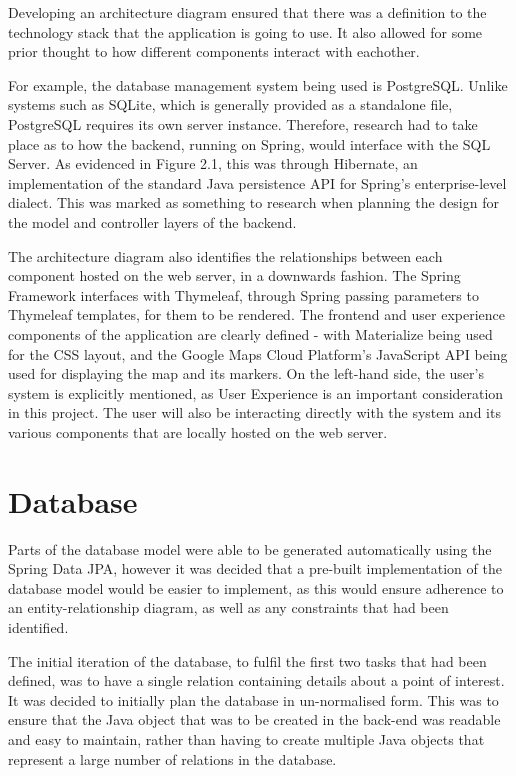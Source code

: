 Developing an architecture diagram ensured that there was a definition to the technology stack that the application is going to use. It also allowed for some prior thought to how different components interact with eachother.

For example, the database management system being used is PostgreSQL. Unlike systems such as SQLite, which is generally provided as a standalone file, PostgreSQL requires its own server instance. Therefore, research had to take place as to how the backend, running on Spring, would interface with the SQL Server. As evidenced in Figure 2.1, this was through Hibernate, an implementation of the standard Java persistence API for Spring's enterprise-level dialect. This was marked as something to research when planning the design for the model and controller layers of the backend.

The architecture diagram also identifies the relationships between each component hosted on the web server, in a downwards fashion. The Spring Framework interfaces with Thymeleaf, through Spring passing parameters to Thymeleaf templates, for them to be rendered. The frontend and user experience components of the application are clearly defined - with Materialize being used for the CSS layout, and the Google Maps Cloud Platform's JavaScript API being used for displaying the map and its markers. On the left-hand side, the user's system is explicitly mentioned, as User Experience is an important consideration in this project. The user will also be interacting directly with the system and its various components that are locally hosted on the web server.

\section{Database}

Parts of the database model were able to be generated automatically using the Spring Data JPA, however it was decided that a pre-built implementation of the database model would be easier to implement, as this would ensure adherence to an entity-relationship diagram, as well as any constraints that had been identified.

The initial iteration of the database, to fulfil the first two tasks that had been defined, was to have a single relation containing details about a point of interest. It was decided to initially plan the database in un-normalised form. This was to ensure that the Java object that was to be created in the back-end was readable and easy to maintain, rather than having to create multiple Java objects that represent a large number of relations in the database.

